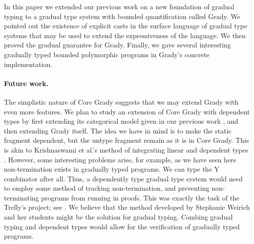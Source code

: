 In this paper we extended our previous work \cite{Eades:2017} on a new
foundation of gradual typing to a gradual type system with bounded
quantification called Grady.  We pointed out the existence of explicit
casts in the surface language of gradual type systems that may be used
to extend the expressiveness of the language.  We then proved the
gradual guarantee for Grady.  Finally, we gave several interesting
gradually typed bounded polymorphic programs in Grady's concrete
implementation.

\paragraph{Future work.}  The simplistic nature of Core Grady suggests
that we may extend Grady with even more features.  We plan to study an
extension of Core Grady with dependent types by first extending its
categorical model given in our previous work \cite{Eades:2017}, and
then extending Grady itself.  The idea we have in mind is to make the
static fragment dependent, but the untype fragment remain as it is in
Core Grady.  This is akin to Krishnaswami et al.'s method of
integrating linear and dependent types
\cite{Krishnaswami:2015:ILD:2676726.2676969}.  However, some
interesting problems arise, for example, as we have seen here
non-termination exists in gradually typed programs.  We can type the Y
combinator after all.  Thus, a dependently type gradual type system
would need to employ some method of tracking non-termination, and
preventing non-terminating programs from running in proofs.  This was
exactly the task of the Trelly's project; see \cite{?}.  We believe
that the method developed by Stephanie Weirich and her students
\cite{Casinghino:2014:CPP:2535838.2535883} might be the solution for
gradual typing.  Combing gradual typing and dependent types would
allow for the verification of gradually typed programs.
